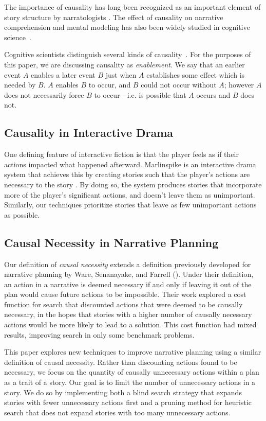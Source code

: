 \documentclass[letterpaper]{article} %
\begin{document}
The importance of causality has long been recognized as an important element of story structure by narratologists \cite{chatman1993reading,bal1997narratology}. The effect of causality on narrative comprehension and mental modeling has also been widely studied in cognitive science~\cite{trabassosperry1985causal,gerrig1993experiencing,zwaan1998situation}.

Cognitive scientists distinguish several kinds of causality~\cite{tapiero2002mental}. For the purposes of this paper, we are discussing causality as \textit{enablement}. We say that an earlier event $A$ enables a later event $B$ just when $A$ establishes some effect which is needed by $B$. $A$ enables $B$ to occur, and $B$ could not occur without $A$; however $A$ does not necessarily force $B$ to occur---i.e. is possible that $A$ occurs and $B$ does not.

\subsection{Causality in Interactive Drama}
One defining feature of interactive fiction is that the player feels as if their actions impacted what happened afterward. Marlinspike is an interactive drama system that achieves this by creating stories such that the player's actions are necessary to the story \cite{tomaszewski2011use}. By doing so, the system produces stories that incorporate more of the player's significant actions, and doesn't leave them as unimportant. Similarly, our techniques prioritize stories that leave as few unimportant actions as possible.

\subsection{Causal Necessity in Narrative Planning}
Our definition of \textit{causal necessity} extends a definition previously developed for narrative planning by Ware, Senanayake, and Farrell (\citeyear{ware2023causal}). Under their definition, an action in a narrative is deemed necessary if and only if leaving it out of the plan would cause future actions to be impossible. Their work explored a cost function for search that discounted actions that were deemed to be causally necessary, in the hopes that stories with a higher number of causally necessary actions would be more likely to lead to a solution. This cost function had mixed results, improving search in only some benchmark problems.

This paper explores new techniques to improve narrative planning using a similar definition of causal necessity. Rather than discounting actions found to be necessary, we focus on the quantity of causally unnecessary actions within a plan as a trait of a story. Our goal is to limit the number of unnecessary actions in a story. We do so by implementing both a blind search strategy that expands stories with fewer unnecessary actions first and a pruning method for heuristic search that does not expand stories with too many unnecessary actions.
\end{document}
